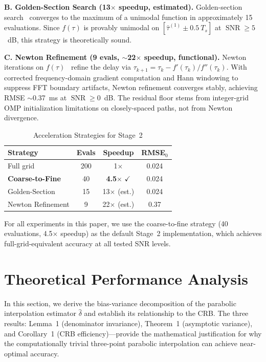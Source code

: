 \documentclass[a4paper,fleqn]{cas-dc}
\DeclareMathOperator{\SNR}{SNR}
\begin{document}
\textbf{B. Golden-Section Search (13$\times$ speedup, estimated).} Golden-section search~\cite{kiefer1953} converges to the maximum of a unimodal function in approximately 15 evaluations. Since $f(\tau)$ is provably unimodal on $[\hat{\tau}^{(1)} \pm 0.5\ T_s]$ at $\SNR \ge 5$~dB, this strategy is theoretically sound.

\textbf{C. Newton Refinement (9 evals, $\sim$22$\times$ speedup, functional).} Newton iterations on $f(\tau)$~\cite{mamandipoor2016} refine the delay via $\tau_{k+1}=\tau_k - f'(\tau_k)/f''(\tau_k)$. With corrected frequency-domain gradient computation and Hann windowing to suppress FFT boundary artifacts, Newton refinement converges stably, achieving RMSE $\sim$0.37~ms at $\SNR\ge 0$~dB. The residual floor stems from integer-grid OMP initialization limitations on closely-spaced paths, not from Newton divergence.

\begin{table}[cols=4,pos=h]
\centering
\caption{Acceleration Strategies for Stage~2}
\label{tab:accel}
\footnotesize
\begin{tabular}{@{}lccc@{}}
\toprule
Strategy & Evals & Speedup & RMSE$_0$ \\
\midrule
Full grid & 200 & 1$\times$ & 0.024 \\
\textbf{Coarse-to-Fine} & 40 & \textbf{4.5}$\times$ $\checkmark$ & 0.024 \\
Golden-Section & 15 & 13$\times$ (est.) & 0.024 \\
Newton Refinement & 9 & 22$\times$ (est.) & 0.37 \\
\bottomrule
\end{tabular}
\end{table}

For all experiments in this paper, we use the coarse-to-fine strategy (40 evaluations, 4.5$\times$ speedup) as the default Stage~2 implementation, which achieves full-grid-equivalent accuracy at all tested SNR levels.

\section{Theoretical Performance Analysis}
\label{sec:theory}

In this section, we derive the bias-variance decomposition of the parabolic interpolation estimator $\hat{\delta}$ and establish its relationship to the CRB. The three results: Lemma~1 (denominator invariance), Theorem~1 (asymptotic variance), and Corollary~1 (CRB efficiency)---provide the mathematical justification for why the computationally trivial three-point parabolic interpolation can achieve near-optimal accuracy.
\end{document}
